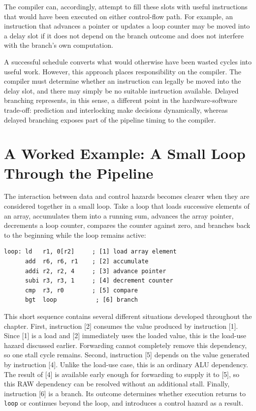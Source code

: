 \documentclass[12pt,a4paper]{report}
\begin{document}
The compiler can, accordingly, attempt to fill these slots with useful instructions that would have been executed on either control-flow path. For example, an instruction that advances a pointer or updates a loop counter may be moved into a delay slot if it does not depend on the branch outcome and does not interfere with the branch's own computation.

A successful schedule converts what would otherwise have been wasted cycles into useful work. However, this approach places responsibility on the compiler. The compiler must determine whether an instruction can legally be moved into the delay slot, and there may simply be no suitable instruction available. Delayed branching represents, in this sense, a different point in the hardware-software trade-off: prediction and interlocking make decisions dynamically, whereas delayed branching exposes part of the pipeline timing to the compiler.~\cite{sarangi}

\section{A Worked Example: A Small Loop Through the Pipeline}
\label{sec:worked-example}

The interaction between data and control hazards becomes clearer when they are considered together in a small loop. Take a loop that loads successive elements of an array, accumulates them into a running sum, advances the array pointer, decrements a loop counter, compares the counter against zero, and branches back to the beginning while the loop remains active:

\begin{lstlisting}[caption={A small loop combining a load-use hazard, an ordinary RAW dependency, and a control hazard},label={lst:worked-loop}]
loop: ld   r1, 0[r2]     ; [1] load array element
      add  r6, r6, r1    ; [2] accumulate
      addi r2, r2, 4     ; [3] advance pointer
      subi r3, r3, 1     ; [4] decrement counter
      cmp  r3, r0        ; [5] compare
      bgt  loop           ; [6] branch
\end{lstlisting}

This short sequence contains several different situations developed throughout the chapter. First, instruction [2] consumes the value produced by instruction [1]. Since [1] is a load and [2] immediately uses the loaded value, this is the load-use hazard discussed earlier. Forwarding cannot completely remove this dependency, so one stall cycle remains. Second, instruction [5] depends on the value generated by instruction [4]. Unlike the load-use case, this is an ordinary ALU dependency. The result of [4] is available early enough for forwarding to supply it to [5], so this RAW dependency can be resolved without an additional stall. Finally, instruction [6] is a branch. Its outcome determines whether execution returns to \texttt{loop} or continues beyond the loop, and introduces a control hazard as a result.
\end{document}
